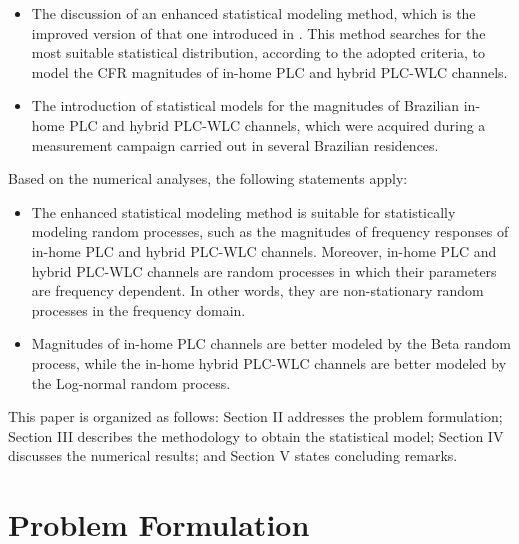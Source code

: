 \documentclass[journal]{IEEEtran}
\begin{document}
\begin{itemize}
	\item The discussion of an enhanced statistical modeling method, which is the improved version of that one introduced in \cite{Luis:AI,Luis:doc}. This method searches for the most suitable statistical distribution, according to the adopted criteria, to model the \ac{CFR} magnitudes of in-home \ac{PLC} and hybrid \ac{PLC}-\ac{WLC} channels.
	
	\item The introduction of statistical models for the magnitudes of Brazilian in-home \ac{PLC} and hybrid \ac{PLC}-\ac{WLC} channels, which were acquired during a measurement campaign carried out in several Brazilian residences.%
\end{itemize}
Based on the numerical analyses, the following statements apply:
\begin{itemize}
    \item The enhanced statistical modeling method is suitable for statistically modeling random processes, such as the magnitudes of frequency responses of in-home \ac{PLC} and hybrid \ac{PLC}-\ac{WLC} channels. Moreover, in-home \ac{PLC} and hybrid \ac{PLC}-\ac{WLC} channels are random processes in which their parameters are frequency dependent. In other words, they are non-stationary random processes in the frequency domain. 
    \item Magnitudes of in-home \ac{PLC} channels are better modeled by the Beta random process, while the in-home hybrid \ac{PLC}-\ac{WLC} channels are better modeled by the Log-normal random process. 
\end{itemize}

This paper is organized as follows: Section II addresses the problem formulation; Section III describes the methodology to obtain the statistical model; Section IV discusses the numerical results; and Section V states concluding remarks.

\section{Problem Formulation}
\end{document}
